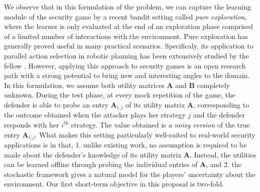 We observe that in this formulation of the problem, we can capture the learning module of the security game by a recent bandit setting called \textit{pure exploration}, where the learner is only evaluated at the end of an exploration phase comprised of a limited number of interactions with the environment. Pure exploration has generally proved useful in many practical scenarios. Specificaly, its application to parallel action selection in robotic planning has been extensively studied by the fellow \cite{Gabillon11MB}. 
However, applying this approach to security games is an open research path with a strong potential to bring new and interesting angles to the domain. 
In this formulation, we assume both utility matrices $\boldsymbol A$ and $\boldsymbol B$ completely unknown. During the test phase, at every  mock repetition of the game, the defender is able to probe an entry $\boldsymbol A_{i,j}$ of its utility matrix $\boldsymbol A$, corresponding to the outcome obtained when the attacker plays her strategy $j$ and the defender responds with her $i^{\text{th}}$ strategy. The value obtained is {\em a noisy version} of the true entry $\boldsymbol A_{i,j}$. What makes this setting particularly well-suited to real-world security applications is in that, 
1. unlike existing work, no assumption is required to be made about the defender's knowledge of its utility matrix $\boldsymbol A$. Instead, the utilities can be learned offline through probing the individual entries of $\boldsymbol A$, and 
2. the stochastic framework gives a natural model for the players' uncertainty about the environment.
%
Our first short-term objective in this proposal is two-fold.
